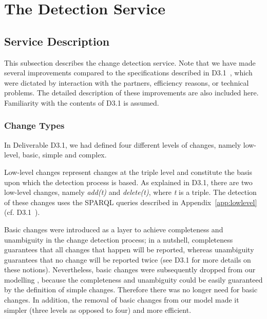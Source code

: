 \section{The Detection Service}
\label{sec:detection}

\subsection{Service Description}
\label{subsec:chdet_description}

This subsection describes the change detection service. Note that we have made several improvements compared to the specifications described in D3.1~\cite{d3.1}, which were dictated by interaction with the partners, efficiency reasons, or technical problems. The detailed description of these improvements are also included here. Familiarity with the contents of D3.1 is assumed.

\subsubsection{Change Types}

In Deliverable D3.1, we had defined four different levels of changes, namely low-level, basic, simple and complex.

Low-level changes represent changes at the triple level and constitute the basis upon which the detection process is based. As explained in D3.1, there are two low-level changes, namely \textit{add(t)} and \textit{delete(t)}, where \textit{t} is a triple. The detection of these changes uses the SPARQL queries described in Appendix~\ref{app:lowlevel} (cf. D3.1~\cite{d3.1}).

Basic changes were introduced as a layer to achieve completeness and unambiguity in the change detection process; in a nutshell, completeness guarantees that all changes that happen will be reported, whereas unambiguity guarantees that no change will be reported twice (see D3.1 for more details on these notions). 
Nevertheless, basic changes were subsequently dropped from our modelling , because the completeness and unambiguity could be easily guaranteed by the definition of simple changes. Therefore there was no longer need for basic changes. In addition, the removal of basic changes from our model made it simpler (three levels as opposed to four) and more efficient.

